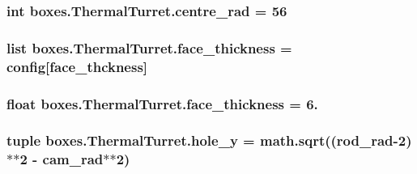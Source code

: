 \subsubsection[{centre\+\_\+rad}]{\setlength{\rightskip}{0pt plus 5cm}int boxes.\+Thermal\+Turret.\+centre\+\_\+rad = 56\hspace{0.3cm}{\ttfamily [static]}}\label{classboxes_1_1_thermal_turret_a5c59e160df5140c8c75f60bb38a67e53}
\hypertarget{classboxes_1_1_thermal_turret_a3fa55e0be67cd754f7a2ee6ba9114bd7}{}
\subsubsection[{face\+\_\+thickness}]{\setlength{\rightskip}{0pt plus 5cm}list boxes.\+Thermal\+Turret.\+face\+\_\+thickness = config\mbox{[}\textquotesingle{}face\+\_\+thckness\textquotesingle{}\mbox{]}\hspace{0.3cm}{\ttfamily [static]}}\label{classboxes_1_1_thermal_turret_a3fa55e0be67cd754f7a2ee6ba9114bd7}
\hypertarget{classboxes_1_1_thermal_turret_a60cdde3cc35554e9e663b97222c04323}{}
\subsubsection[{face\+\_\+thickness}]{\setlength{\rightskip}{0pt plus 5cm}float boxes.\+Thermal\+Turret.\+face\+\_\+thickness = 6.\hspace{0.3cm}{\ttfamily [static]}}\label{classboxes_1_1_thermal_turret_a60cdde3cc35554e9e663b97222c04323}
\hypertarget{classboxes_1_1_thermal_turret_a9120663d179eeb2f51fbd6a0533d82be}{}
\subsubsection[{hole\+\_\+y}]{\setlength{\rightskip}{0pt plus 5cm}tuple boxes.\+Thermal\+Turret.\+hole\+\_\+y = math.\+sqrt(({\bf rod\+\_\+rad}-\/2)$\ast$$\ast$2 -\/ cam\+\_\+rad$\ast$$\ast$2)\hspace{0.3cm}{\ttfamily [static]}}\label{classboxes_1_1_thermal_turret_a9120663d179eeb2f51fbd6a0533d82be}
\hypertarget{classboxes_1_1_thermal_turret_ae4006d874c27a729856c09b1e2e0b761}{}

